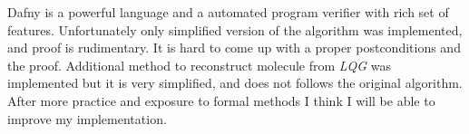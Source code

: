 Dafny is a powerful language and a automated program verifier with rich set of features. Unfortunately only simplified version of the algorithm was implemented, and proof is rudimentary. It is hard to come up with a proper postconditions and the proof. Additional method to reconstruct molecule from \textit{LQG} was implemented but it is very simplified, and does not follows the original algorithm.
After more practice and exposure to formal methods I think I will be able to improve my implementation.
